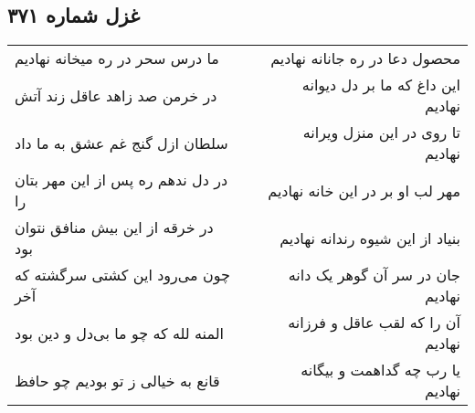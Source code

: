 \begin{center}
\section*{غزل شماره ۳۷۱}
\label{sec:sh371}
\begin{longtable}{l p{0.5cm} r}
ما درس سحر در ره میخانه نهادیم
&&
محصول دعا در ره جانانه نهادیم
\\
در خرمن صد زاهد عاقل زند آتش
&&
این داغ که ما بر دل دیوانه نهادیم
\\
سلطان ازل گنج غم عشق به ما داد
&&
تا روی در این منزل ویرانه نهادیم
\\
در دل ندهم ره پس از این مهر بتان را
&&
مهر لب او بر در این خانه نهادیم
\\
در خرقه از این بیش منافق نتوان بود
&&
بنیاد از این شیوه رندانه نهادیم
\\
چون می‌رود این کشتی سرگشته که آخر
&&
جان در سر آن گوهر یک دانه نهادیم
\\
المنه لله که چو ما بی‌دل و دین بود
&&
آن را که لقب عاقل و فرزانه نهادیم
\\
قانع به خیالی ز تو بودیم چو حافظ
&&
یا رب چه گداهمت و بیگانه نهادیم
\\
\end{longtable}
\end{center}
